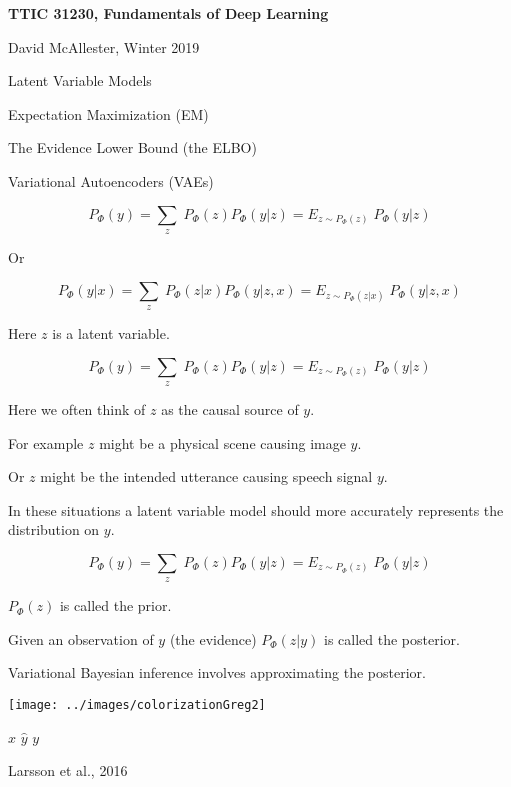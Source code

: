





{\Huge

  \centerline{\bf TTIC 31230, Fundamentals of Deep Learning}
  \bigskip
  \centerline{David McAllester, Winter 2019}
  \vfill
  \centerline{Latent Variable Models}
  \vfill
  \centerline{Expectation Maximization (EM)}
  \vfill
  \centerline{The Evidence Lower Bound (the ELBO)}
  \vfill
  \centerline{Variational Autoencoders (VAEs)}
  \vfill
  \vfill


{\color{red} $$P_\Phi(y) = \sum_z\;P_\Phi(z)P_\Phi(y|z) = E_{z \sim P_\Phi(z)}\;P_\Phi(y|z)$$}

Or

\vfill
{\color{red} $$P_\Phi(y|x) = \sum_z\;P_\Phi(z|x)P_\Phi(y|z,x) = E_{z \sim P_\Phi(z|x)}\;P_\Phi(y|z,x)$$}

\vfill
Here {\color{red} $z$} is a latent variable.


{\color{red} $$P_\Phi(y) = \sum_z\;P_\Phi(z)P_\Phi(y|z) = E_{z \sim P_\Phi(z)}\;P_\Phi(y|z)$$}

Here we often think of $z$ as the causal source of $y$.

\vfill
For example $z$ might be a physical scene causing image $y$.

\vfill
Or $z$ might be the intended utterance causing speech signal $y$.

\vfill
In these situations a latent variable model should more accurately represents the distribution on $y$.


{\color{red} $$P_\Phi(y) = \sum_z\;P_\Phi(z)P_\Phi(y|z) = E_{z \sim P_\Phi(z)}\;P_\Phi(y|z)$$}

\vfill
$P_\Phi(z)$ is called the prior.

\vfill
Given an observation of $y$ (the evidence) $P_\Phi(z|y)$ is called the posterior.

\vfill
Variational Bayesian inference involves approximating the posterior.

\medskip
\centerline{\texttt{[image: ../images/colorizationGreg2]}}
\centerline{$x$ \hspace{4em} $\hat{y}$ \hspace{4em} $y$}
\centerline{\huge Larsson et al., 2016}

}
